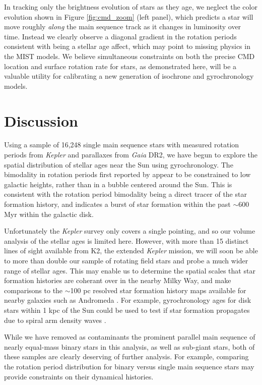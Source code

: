\documentclass[preprint2]{aastex62}
\newcommand{\Kepler}{\textsl{Kepler}\xspace}
\begin{document}
In tracking only the brightness evolution of stars as they age, we neglect the color evolution shown in Figure \ref{fig:cmd_zoom} (left panel), which predicts a star will move roughly {\it along} the main sequence track as it changes in luminosity over time. Instead we clearly observe a diagonal gradient in the rotation periods consistent with being a stellar age affect, which may point to missing physics in the MIST models. 
We believe simultaneous constraints on both the precise CMD location and surface rotation rate for stars, as demonstrated here, will be a valuable utility for calibrating a new generation of isochrone and gyrochronology models.






\section{Discussion}

Using a sample of 16,248 single main sequence stars with measured rotation periods from \Kepler and parallaxes from {\em Gaia} DR2, we have begun to explore the spatial distribution of stellar ages near the Sun using gyrochronology. The bimodality in rotation periods first reported by \citet{mcquillan2013} appear to be constrained to low galactic heights, rather than in a bubble centered around the Sun. This is consistent with the rotation period bimodality being a direct tracer of the star formation history, and indicates a burst of star formation within the past $\sim$600 Myr within the galactic disk.


Unfortunately the \Kepler survey only covers a single pointing, and so our volume analysis of the stellar ages is limited here. However, with more than 15 distinct lines of sight available from K2, the extended \Kepler mission, we will soon be able to more than double our sample of rotating field stars and probe a much wider range of stellar ages. This may enable us to determine the spatial scales that star formation histories are coherant over in the nearby Milky Way, and make comparisons to the $\sim$100 pc resolved star formation history maps available for nearby galaxies such as Andromeda \citep[][]{lewis2015,williams2017}. For example, gyrochronology ages for disk stars within 1 kpc of the Sun could be used to test if star formation propagates due to spiral arm density waves \citep[e.g. see][]{choi2015}.


While we have removed as contaminants the prominent parallel main sequence of nearly equal-mass binary stars in this analysis, as well as sub-giant stars, both of these samples are clearly deserving of further analysis. For example, comparing the rotation period distribution for binary versus single main sequence stars may provide constraints on their dynamical histories. 
\end{document}

